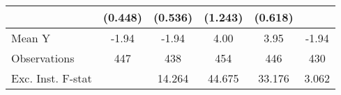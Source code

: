 {\begin{tabular}{l*{5}{c}}
            &     (0.448)         &     (0.536)         &     (1.243)         &     (0.618)         &                     \\
\midrule
Mean Y      &       -1.94         &       -1.94         &        4.00         &        3.95         &       -1.94         \\
Observations&         447         &         438         &         454         &         446         &         430         \\
Exc. Inst. F-stat&                     &      14.264         &      44.675         &      33.176         &       3.062         \\
\bottomrule
\end{tabular}
}
